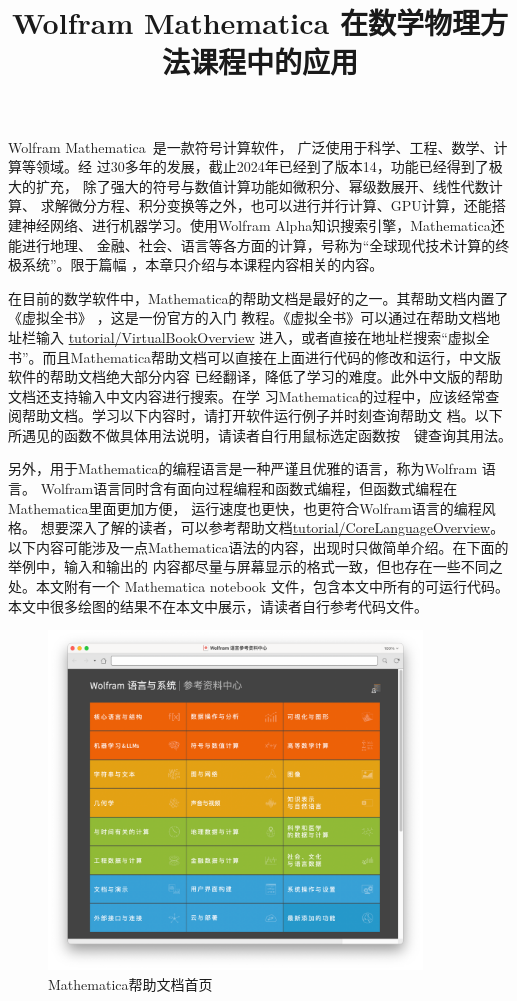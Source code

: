 \documentclass[UTF8,a4paper,10pt]{ctexart}
\title{Wolfram Mathematica 在数学物理方法课程中的应用}
\author{}
\date{}
\begin{document}
\maketitle


Wolfram Mathematica~是一款符号计算软件，
广泛使用于科学、工程、数学、计算等领域。经
过30多年的发展，截止2024年已经到了版本14，功能已经得到了极大的扩充，
除了强大的符号与数值计算功能如微积分、幂级数展开、线性代数计算、
求解微分方程、积分变换等之外，也可以进行并行计算、GPU计算，还能搭
建神经网络、进行机器学习。使用Wolfram Alpha知识搜索引擎，Mathematica还能进行地理、
金融、社会、语言等各方面的计算，号称为“全球现代技术计算的终极系统”。限于篇幅
，本章只介绍与本课程内容相关的内容。

在目前的数学软件中，Mathematica的帮助文档是最好的之一。其帮助文档内置了《虚拟全书》
，这是一份官方的入门
教程。《虚拟全书》可以通过在帮助文档地址栏输入
\href{http://reference.wolfram.com/language/tutorial/VirtualBookOverview.html}{tutorial/VirtualBookOverview}
进入，或者直接在地址栏搜索“虚拟全书”。而且Mathematica帮助文档可以直接在上面进行代码的修改和运行，中文版软件的帮助文档绝大部分内容
已经翻译，降低了学习的难度。此外中文版的帮助文档还支持输入中文内容进行搜索。在学
习Mathematica的过程中，应该经常查阅帮助文档。学习以下内容时，请打开软件运行例子并时刻查询帮助文
档。以下所遇见的函数不做具体用法说明，请读者自行用鼠标选定函数按~~键查询其用法。

另外，用于Mathematica的编程语言是一种严谨且优雅的语言，称为Wolfram 语言。
Wolfram语言同时含有面向过程编程和函数式编程，但函数式编程在Mathematica里面更加方便，
运行速度也更快，也更符合Wolfram语言的编程风格。
想要深入了解的读者，可以参考帮助文档\href{http://reference.wolfram.com/language/tutorial/CoreLanguageOverview.html}{tutorial/CoreLanguageOverview}。
以下内容可能涉及一点Mathematica语法的内容，出现时只做简单介绍。在下面的举例中，输入和输出的
内容都尽量与屏幕显示的格式一致，但也存在一些不同之处。本文附有一个 Mathematica notebook 文件，包含本文中所有的可运行代码。本文中很多绘图的结果不在本文中展示，请读者自行参考代码文件。


\begin{figure}[htbp]
\centering
\includegraphics[height=9cm]{img/DocMain.pdf}
\caption{Mathematica帮助文档首页}
\end{figure}
\end{document}
